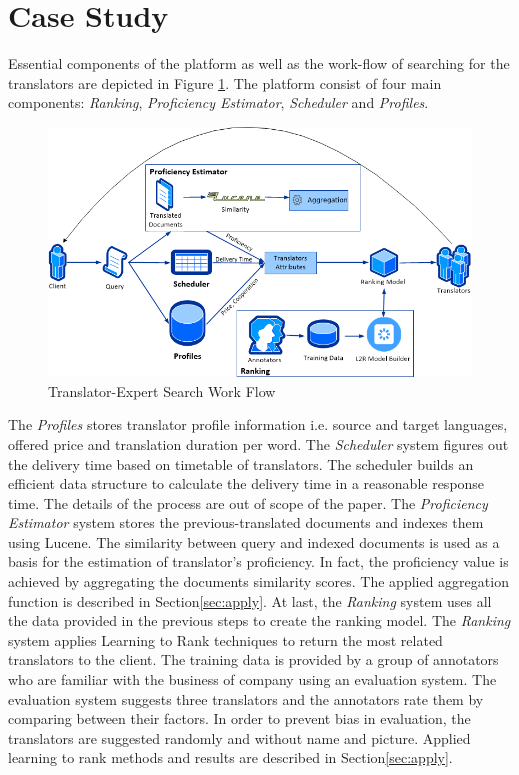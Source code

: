 \section{Case Study}
\label{sec:casestudy}
Essential components of the platform as well as the work-flow of searching for the translators are depicted in Figure \ref{fig:architecture}. The platform consist of four main components: \textit{Ranking}, \textit{Proficiency Estimator}, \textit{Scheduler} and \textit{Profiles}.

\begin{figure}
\begin{center}
\includegraphics[width=12cm]{figures/dataflow.png}
\caption{Translator-Expert Search Work Flow
\label{fig:architecture}}
\end{center}
\end{figure}

The \textit{Profiles} stores translator profile information i.e. source and target languages, offered price and translation duration per word. The \textit{Scheduler} system figures out the delivery time based on timetable of translators. The scheduler builds an efficient data structure to calculate the delivery time in a reasonable response time. The details of the process are out of scope of the paper. The \textit{Proficiency Estimator} system stores the previous-translated documents and indexes them using Lucene. The similarity between query and indexed documents is used as a basis for the estimation of translator's proficiency. In fact, the proficiency value is achieved by aggregating the documents similarity scores. The applied aggregation function is described in Section\ref{sec:apply}. At last, the \textit{Ranking} system uses all the data provided in the previous steps to create the ranking model. The \textit{Ranking} system applies Learning to Rank techniques to return the most related translators to the client. The training data is provided by a group of annotators who are familiar with the business of company using an evaluation system. The evaluation system suggests three translators and the annotators rate them by comparing between their factors. In order to prevent bias in evaluation, the translators are suggested randomly and without name and picture. Applied learning to rank methods and results are described in Section\ref{sec:apply}. 

